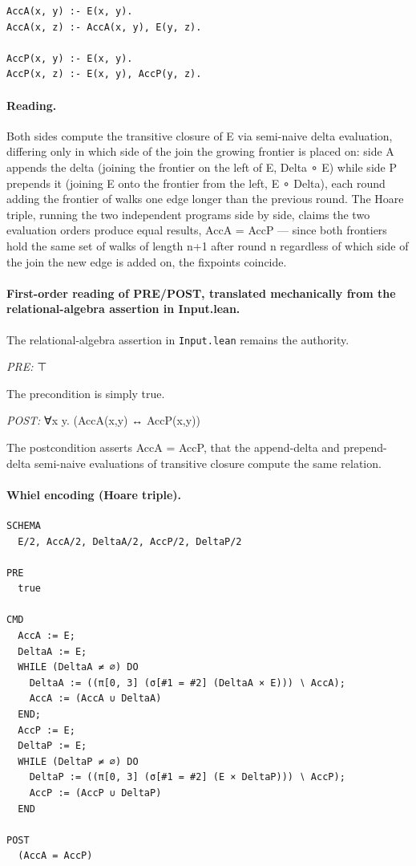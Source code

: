 \documentclass[10pt]{article}
\begin{document}
\begin{Verbatim}[fontsize=\scriptsize,breaklines=true,breakanywhere=true,frame=single,framesep=1.5mm]
AccA(x, y) :- E(x, y).
AccA(x, z) :- AccA(x, y), E(y, z).

AccP(x, y) :- E(x, y).
AccP(x, z) :- E(x, y), AccP(y, z).
\end{Verbatim}

\paragraph{Reading.} Both sides compute the transitive closure of E via semi-naive delta evaluation, differing only in which side of the join the growing frontier is placed on: side A appends the delta (joining the frontier on the left of E, Delta ∘ E) while side P prepends it (joining E onto the frontier from the left, E ∘ Delta), each round adding the frontier of walks one edge longer than the previous round. The Hoare triple, running the two independent programs side by side, claims the two evaluation orders produce equal results, AccA = AccP --- since both frontiers hold the same set of walks of length n+1 after round n regardless of which side of the join the new edge is added on, the fixpoints coincide.

\paragraph{First-order reading of PRE/POST, translated mechanically from the relational-algebra assertion in Input.lean.} The relational-algebra assertion in \texttt{Input.lean} remains the authority.

\textit{PRE:} ⊤\par The precondition is simply true.

\textit{POST:} ∀x y. (AccA(x,y) ↔ AccP(x,y))\par The postcondition asserts AccA = AccP, that the append-delta and prepend-delta semi-naive evaluations of transitive closure compute the same relation.

\paragraph{Whiel encoding (Hoare triple).}

\begin{Verbatim}[fontsize=\scriptsize,breaklines=true,breakanywhere=true,frame=single,framesep=1.5mm]
SCHEMA
  E/2, AccA/2, DeltaA/2, AccP/2, DeltaP/2

PRE
  true 

CMD
  AccA := E;
  DeltaA := E;
  WHILE (DeltaA ≠ ∅) DO
    DeltaA := ((π[0, 3] (σ[#1 = #2] (DeltaA × E))) ∖ AccA);
    AccA := (AccA ∪ DeltaA)
  END;
  AccP := E;
  DeltaP := E;
  WHILE (DeltaP ≠ ∅) DO
    DeltaP := ((π[0, 3] (σ[#1 = #2] (E × DeltaP))) ∖ AccP);
    AccP := (AccP ∪ DeltaP)
  END

POST
  (AccA = AccP)
\end{Verbatim}
\end{document}
